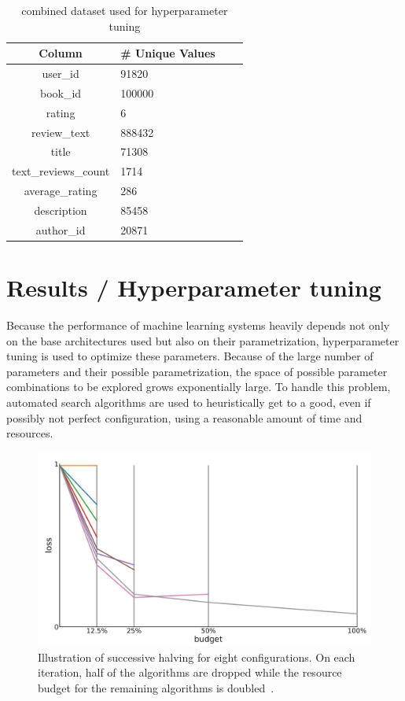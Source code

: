 \documentclass[10pt,final,journal,a4paper,oneside,twocolumn]{IEEEtran}
\begin{document}
\begin{table}[h]
    \centering
        \caption{combined dataset used for hyperparameter tuning}
        \begin{tabular}{clll}
                \toprule
                Column & \# Unique Values \\
                \midrule
                user\_id & 91820  \\
                book\_id & 100000\\
                rating & 6\\
                review\_text & 888432\\
                title & 71308 \\
                text\_reviews\_count & 1714 \\
                average\_rating & 286 \\
                description & 85458 \\
                author\_id & 20871 \\
                \bottomrule
        \end{tabular}
            \label{tab:used_data}
\end{table}
    
\section{Results / Hyperparameter tuning}
Because the performance of machine learning systems heavily depends not only on the base architectures used but also on their parametrization, hyperparameter tuning is used to optimize these parameters.
Because of the large number of parameters and their possible parametrization, the space of possible parameter combinations to be explored grows exponentially large. To handle this problem, automated search algorithms are used to heuristically get to a good, even if possibly not perfect configuration, using a reasonable amount of time and resources.

\begin{figure}[ht]
    \centering
    \includegraphics[width=\linewidth]{successive_halving}
    \caption{Illustration of successive halving for eight configurations. On each iteration, half of the algorithms are dropped while the resource budget for the remaining algorithms is doubled~\cite{Feurer.2019}.}
    \label{fig:succ_halving}
\end{figure}
\end{document}
